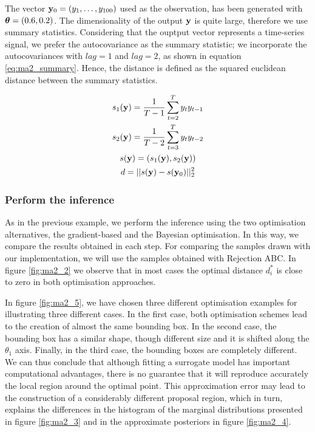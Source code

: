 \noindent
The vector $\mathbf{y}_0 = (y_1, \ldots, y_{100})$ used as the observation,
has been generated with $\boldsymbol{\theta}=(0.6, 0.2)$. The dimensionality of
the output $\mathbf{y}$ is quite large, therefore we use summary
statistics. Considering that the ouptput vector represents a
time-series signal, we prefer the autocovariance as the summary
statistic; we incorporate the autocovariances with $lag=1$ and
$lag=2$, as shown in equation \eqref{eq:ma2_summary}. Hence, the
distance is defined as the squared euclidean distance between the
summary statistics.

\begin{gather} \label{eq:ma2_summary}
  s_1(\mathbf{y}) = \frac{1}{T-1} \sum_{t=2}^T y_ty_{t-1}\\
  s_2(\mathbf{y}) = \frac{1}{T-2} \sum_{t=3}^T y_ty_{t-2} \\
  s(\mathbf{y}) = (s_1(\mathbf{y}), s_2(\mathbf{y}))\\
  d = ||s(\mathbf{y}) - s(\mathbf{y}_0)||_2^2
\end{gather}


\subsubsection*{Perform the inference}

As in the previous example, we perform the inference using the two
optimisation alternatives, the gradient-based and the Bayesian
optimisation. In this way, we compare the results obtained in each
step. For comparing the samples drawn with our implementation, we will
use the samples obtained with Rejection ABC. In figure \ref{fig:ma2_2}
we observe that in most cases the optimal distance $d_i^*$ is close to
zero in both optimisation approaches.

In figure \ref{fig:ma2_5}, we have chosen three different optimisation
examples for illustrating three different cases. In the first case,
both optimisation schemes lead to the creation of almost the same
bounding box. In the second case, the bounding box has a similar
shape, though different size and it is shifted along the $\theta_1$
axis. Finally, in the third case, the bounding boxes are completely
different. We can thus conclude that although fitting a surrogate
model has important computational advantages, there is no guarantee
that it will reproduce accurately the local region around the optimal
point. This approximation error may lead to the construction of a
considerably different proposal region, which in turn, explains the
differences in the histogram of the marginal distributions presented
in figure \ref{fig:ma2_3} and in the approximate posteriors in figure
\ref{fig:ma2_4}.

